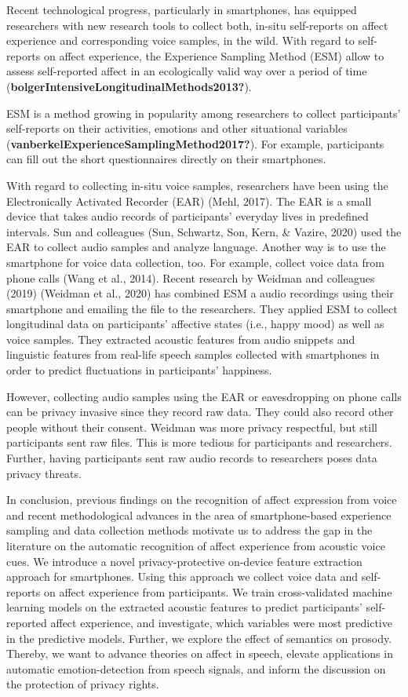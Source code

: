 \documentclass[
  english,
  man,floatsintext]{apa6}
\begin{document}
Recent technological progress, particularly in smartphones, has equipped researchers with new research tools to collect both, in-situ self-reports on affect experience and corresponding voice samples, in the wild. With regard to self-reports on affect experience, the Experience Sampling Method (ESM) allow to assess self-reported affect in an ecologically valid way over a period of time (\textbf{bolgerIntensiveLongitudinalMethods2013?}).

ESM is a method growing in popularity among researchers to collect participants' self-reports on their activities, emotions and other situational variables (\textbf{vanberkelExperienceSamplingMethod2017?}). For example, participants can fill out the short questionnaires directly on their smartphones.

With regard to collecting in-situ voice samples, researchers have been using the Electronically Activated Recorder (EAR) (Mehl, 2017). The EAR is a small device that takes audio records of participants' everyday lives in predefined intervals. Sun and colleagues (Sun, Schwartz, Son, Kern, \& Vazire, 2020) used the EAR to collect audio samples and analyze language. Another way is to use the smartphone for voice data collection, too. For example, collect voice data from phone calls (Wang et al., 2014). Recent research by Weidman and colleagues (2019) (Weidman et al., 2020) has combined ESM a audio recordings using their smartphone and emailing the file to the researchers. They applied ESM to collect longitudinal data on participants' affective states (i.e., happy mood) as well as voice samples. They extracted acoustic features from audio snippets and linguistic features from real-life speech samples collected with smartphones in order to predict fluctuations in participants' happiness.

However, collecting audio samples using the EAR or eavesdropping on phone calls can be privacy invasive since they record raw data. They could also record other people without their consent. Weidman was more privacy respectful, but still participants sent raw files. This is more tedious for participants and researchers. Further, having participants sent raw audio records to researchers poses data privacy threats.

In conclusion, previous findings on the recognition of affect expression from voice and recent methodological advances in the area of smartphone-based experience sampling and data collection methods motivate us to address the gap in the literature on the automatic recognition of affect experience from acoustic voice cues. We introduce a novel privacy-protective on-device feature extraction approach for smartphones. Using this approach we collect voice data and self-reports on affect experience from participants. We train cross-validated machine learning models on the extracted acoustic features to predict participants' self-reported affect experience, and investigate, which variables were most predictive in the predictive models. Further, we explore the effect of semantics on prosody. Thereby, we want to advance theories on affect in speech, elevate applications in automatic emotion-detection from speech signals, and inform the discussion on the protection of privacy rights.
\end{document}
